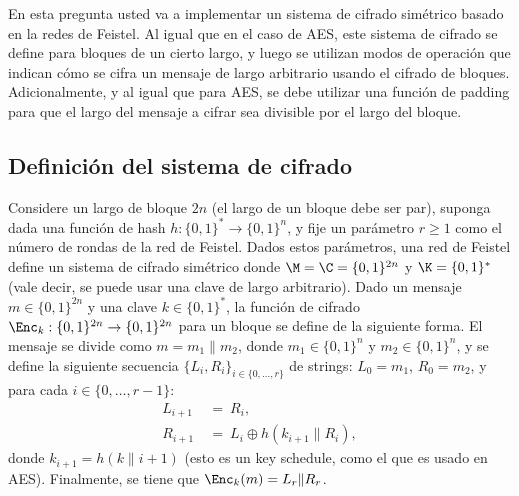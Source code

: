 
En esta pregunta usted va a implementar un sistema de cifrado simétrico basado en la redes de Feistel.
Al igual que en el caso de AES, este sistema de cifrado se define para bloques de un cierto largo, y luego se utilizan modos de operación que indican cómo se cifra un mensaje de largo arbitrario usando el cifrado de bloques. Adicionalmente, y al igual que para AES, se debe utilizar una función de padding para que el largo del mensaje a cifrar sea divisible por el largo del bloque.

\subsection*{Definición del sistema de cifrado}
Considere un largo de bloque $2n$ (el largo de un bloque debe ser par), suponga dada una función de hash $h : \{0,1\}^* \to \{0,1\}^n$, y fije un parámetro $r \geq 1$ como el número de rondas de la red de Feistel. Dados estos parámetros, una red de Feistel define un sistema de cifrado simétrico donde $\M = \C = \{0,1\}^{2n}$ y $\K = \{0,1\}^*$ (vale decir, se puede usar una clave de largo arbitrario). Dado un mensaje $m \in \{0,1\}^{2n}$ y una clave $k \in \{0,1\}^*$, la función de cifrado $\Enc_k : \{0,1\}^{2n} \to \{0,1\}^{2n}$ para un bloque se define de la siguiente forma. El mensaje se divide como $m = m_1 \| m_2$, donde $m_1 \in \{0,1\}^n$ y $m_2 \in \{0,1\}^n$, y se define la siguiente secuencia $\{L_i, R_i\}_{i \in \{0, \ldots, r\}}$ de strings: $L_0 = m_1$, $R_0 = m_2$, y para cada $i \in \{0, \ldots, r-1\}$:
\begin{align*}
L_{i+1} \ &= \ R_i,\\
R_{i+1} \ & = \ L_i \oplus h(k_{i+1} \| R_i),
\end{align*}
donde $k_{i+1} = h(k \| i+1)$ (esto es un key schedule, como el que es usado en AES). Finalmente, se tiene que $\Enc_k(m) = L_r \| R_r$.

